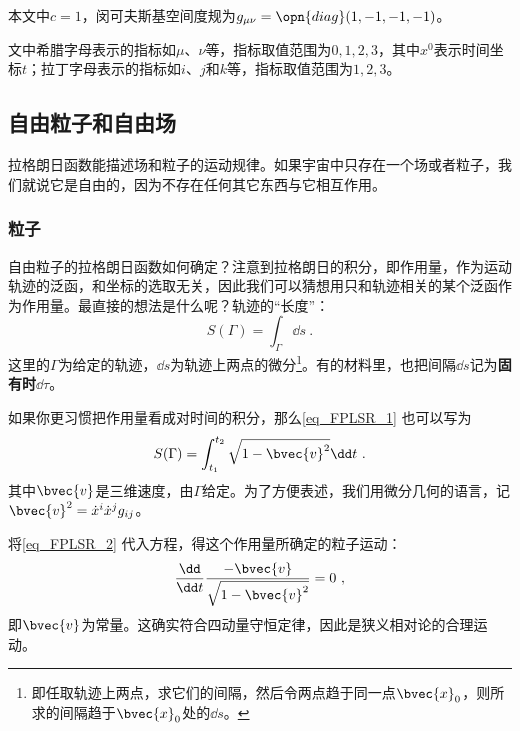 

本文中$c=1$，闵可夫斯基空间度规为$g_{\mu\nu} = \opn{diag}(1, -1, -1, -1)$。

文中希腊字母表示的指标如$\mu$、$\nu$等，指标取值范围为$0, 1, 2, 3$，其中$x^0$表示时间坐标$t$；拉丁字母表示的指标如$i$、$j$和$k$等，指标取值范围为$1, 2, 3$。

\subsection{自由粒子和自由场}

拉格朗日函数能描述场和粒子的运动规律。如果宇宙中只存在一个场或者粒子，我们就说它是自由的，因为不存在任何其它东西与它相互作用。

\subsubsection{粒子}

自由粒子的拉格朗日函数如何确定？注意到拉格朗日的积分，即作用量，作为运动轨迹的泛函，和坐标的选取无关，因此我们可以猜想用只和轨迹相关的某个泛函作为作用量。最直接的想法是什么呢？轨迹的“长度”：
\begin{equation}\label{eq_FPLSR_1}
S(\Gamma) = \int_\Gamma \dd s~.
\end{equation}
这里的$\Gamma$为给定的轨迹，$\dd s$为轨迹上两点的微分\footnote{即任取轨迹上两点，求它们的间隔，然后令两点趋于同一点$\bvec{x}_0$，则所求的间隔趋于$\bvec{x}_0$处的$\dd s$。}。有的材料里，也把间隔$\dd s$记为\textbf{固有时}$\dd \tau$。

如果你更习惯把作用量看成对时间的积分，那么\autoref{eq_FPLSR_1} 也可以写为
\begin{equation}\label{eq_FPLSR_2}
S(\Gamma) = \int_{t_1}^{t_2} \sqrt{1-\bvec{v}^2} \dd t~.
\end{equation}
其中$\bvec{v}$是三维速度，由$\Gamma$给定。为了方便表述，我们用微分几何的语言，记$\bvec{v}^2=\dot{x}^i\dot{x}^jg_{ij}$。

将\autoref{eq_FPLSR_2} 代入方程，得这个作用量所确定的粒子运动：
\begin{equation}
\frac{\dd}{\dd t}\frac{-\bvec{v}}{\sqrt{1-\bvec{v}^2}} = 0~,
\end{equation}
即$\bvec{v}$为常量。这确实符合四动量守恒定律，因此是狭义相对论的合理运动。

